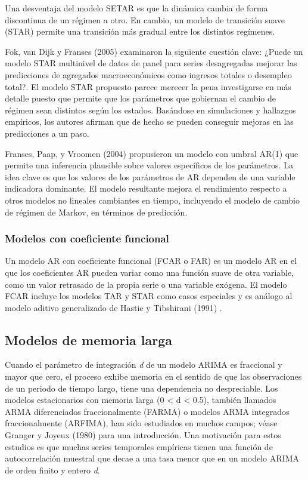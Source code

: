 \documentclass{llncs}
\begin{document}
Una desventaja del modelo SETAR es que la dinámica cambia de forma discontinua de un régimen a otro. En cambio, un modelo de transición suave (STAR) permite una transición más gradual entre los distintos regímenes. 

Fok, van Dijk y Franses (2005) \cite{Fok2005785} examinaron la siguiente cuestión clave: ¿Puede un modelo STAR multinivel de datos de panel para series desagregadas mejorar las predicciones de agregados macroeconómicos como ingresos totales o desempleo total?. El modelo STAR propuesto parece merecer la pena investigarse en más detalle puesto que permite que los parámetros que gobiernan el cambio de régimen sean distintos según los estados. Basándose en simulaciones y hallazgos empíricos, los autores afirman que de hecho se pueden conseguir mejoras en las predicciones a un paso.

Franses, Paap, y Vroomen (2004) \cite{Franses2004255} propusieron un modelo con umbral AR(1) que permite una inferencia plausible sobre valores específicos de los parámetros. La idea clave es que los valores de los parámetros de AR dependen de una variable indicadora dominante. El modelo resultante mejora el rendimiento respecto a otros modelos no lineales cambiantes en tiempo, incluyendo el modelo de cambio de régimen de Markov, en términos de predicción.

\subsubsection{Modelos con coeficiente funcional}
Un modelo AR con coeficiente funcional (FCAR o FAR) es un modelo AR en el que los coeficientes AR pueden variar como una función suave de otra variable, como un valor retrasado de la propia serie o una variable exógena. El modelo FCAR incluye los modelos TAR y STAR como casos especiales y es análogo al modelo aditivo generalizado de Hastie y Tibshirani (1991) \cite{Hastie1990}. 


\subsection{Modelos de memoria larga}
Cuando el parámetro de integración \emph{d} de un modelo ARIMA es fraccional y mayor que cero, el proceso exhibe memoria en el sentido de que las observaciones de un periodo de tiempo largo, tiene una dependencia no despreciable. Los modelos estacionarios con memoria larga (0 < d < 0.5), también llamados ARMA diferenciados fraccionalmente (FARMA) o modelos ARMA integrados fraccionalmente (ARFIMA), han sido estudiados en muchos campos; véase Granger y Joyeux (1980) \cite{Granger198015} para una introducción. Una motivación para estos estudios es que muchas series temporales empíricas tienen una función de autocorrelación muestral que decae a una tasa menor que en un modelo ARIMA de orden finito y entero \emph{d}.
\end{document}
